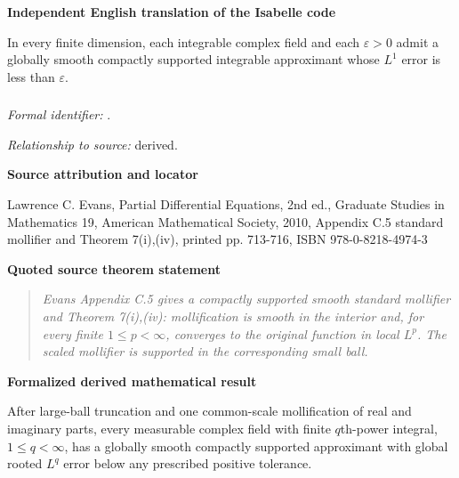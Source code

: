 \documentclass[10pt,oneside]{article}
\newenvironment{sourcequote}{\begin{quote}\itshape}{\end{quote}}
\newcommand{\reviewlabel}[1]{\par\smallskip\noindent\textsf{\bfseries #1}\par\smallskip}
\begin{document}
\reviewlabel{Independent English translation of the Isabelle code}
In every finite dimension, each integrable complex field and each $\varepsilon>0$ admit a globally smooth compactly supported integrable approximant whose $L^1$ error is less than $\varepsilon$.

\subsubsection{\texttt{}}
\noindent\textit{Formal identifier:} \texttt{}.\par
\noindent\textit{Relationship to source:} derived.

\reviewlabel{Source attribution and locator}
Lawrence C. Evans, Partial Differential Equations, 2nd ed., Graduate Studies in Mathematics 19, American Mathematical Society, 2010, Appendix C.5 standard mollifier and Theorem 7(i),(iv), printed pp. 713-716, ISBN 978-0-8218-4974-3

\reviewlabel{Quoted source theorem statement}
\begin{sourcequote}
Evans Appendix C.5 gives a compactly supported smooth standard mollifier and Theorem 7(i),(iv): mollification is smooth in the interior and, for every finite $1\leq p<\infty$, converges to the original function in local $L^p$. The scaled mollifier is supported in the corresponding small ball.
\end{sourcequote}

\reviewlabel{Formalized derived mathematical result}
After large-ball truncation and one common-scale mollification of real and imaginary parts, every measurable complex field with finite $q$th-power integral, $1\leq q<\infty$, has a globally smooth compactly supported approximant with global rooted $L^q$ error below any prescribed positive tolerance.
\end{document}

